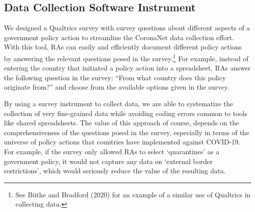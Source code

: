 \documentclass[]{article}
\let\rmarkdownfootnote\footnote%
\def\footnote{\protect\rmarkdownfootnote}
\begin{document}
\hypertarget{data-collection-software-instrument}{%
\subsection{Data Collection Software Instrument}\label{data-collection-software-instrument}}

We designed a Qualtrics survey with survey questions about different aspects of a government policy action to streamline the CoronaNet data collection effort. With this tool, RAs can easily and efficiently document different policy actions by answering the relevant questions posed in the survey.\footnote{See Büthe and Bradford (2020) for an example of a similar use of Qualtrics in collecting data.} For example, instead of entering the country that initiated a policy action into a spreadsheet, RAs answer the following question in the survey: ``From what country does this policy originate from?'' and choose from the available options given in the survey.

By using a survey instrument to collect data, we are able to systematize the collection of very fine-grained data while avoiding coding errors common to tools like shared spreadsheets. The value of this approach of course, depends on the comprehensiveness of the questions posed in the survey, especially in terms of the universe of policy actions that countries have implemented against COVID-19. For example, if the survey only allowed RAs to select `quarantines' as a government policy, it would not capture any data on `external border restrictions', which would seriously reduce the value of the resulting data.
\end{document}

